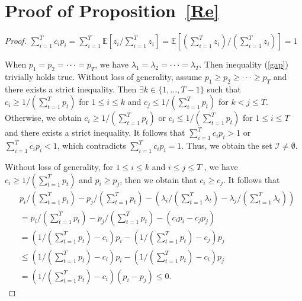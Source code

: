 \documentclass{article} \usepackage{iclr2019_conference,times}
\begin{document}
\section{Proof of Proposition~\ref{Re}}\label{proof_re} 

\begin{proof}


$\sum\nolimits_{i = 1} ^T {c_ip_i}   =   \sum\nolimits_{i = 1}^T {\mathbb{E}[{z_i}/\sum\nolimits_{i=1}^T{{z_i}} ]} = \mathbb{E}\left[ (\sum\nolimits_{i=1}^T{{z_i}})/(\sum\nolimits_{i=1}^T{{z_i}}) \right]   =1$

When $p_1 = p_2 = \cdot \cdot  \cdot = p_T$, we have $\lambda_1 = \lambda_2 = \cdot \cdot  \cdot = \lambda_T$. Then inequality (\ref{gap}) trivially holds true.
Without loss of generality, assume $p_1 \ge p_2 \ge \cdot \cdot  \cdot \ge p_T$ and there exists a strict inequality.  Then $\exists k \in \{1,...,T-1 \}$ such that $c_i \ge 1/({\sum\nolimits_{t = 1}^T {{p_t}} })$ for $ 1 \le i \le k$ and $c_j \le 1/({\sum\nolimits_{t = 1}^T {{p_t}} })$ for   $ k < j \le T$. Otherwise, we obtain  $c_i \ge 1/({\sum\nolimits_{t = 1}^T {{p_t}} })$  or  $c_i \le 1/({\sum\nolimits_{t = 1}^T {{p_t}} })$ for $ 1 \le i \le T$ and there exists a strict inequality. It follows that    $ \sum\nolimits_{i=1}^T{c_ip_i} > 1$ or  $ \sum\nolimits_{i=1}^T{c_ip_i} < 1$, which  contradicts  $ \sum\nolimits_{i=1}^T{c_ip_i} = 1$.  Thus, we obtain the set  $\mathcal{I} \ne \emptyset  $.


Without loss of generality, 
for $ 1 \le i \le k$ and $i \le j \le T$ , we  have $c_i \ge 1/({\sum\nolimits_{t = 1}^T {{p_t}} })$ and $p_i \ge p_j$, then we obtain that $c_i \ge c_j$. It follows that 
\begin{align}
& {p_i}/(\sum\nolimits_{t = 1}^T {{p_t}} ) - {p_j}/(\sum\nolimits_{t = 1}^T {{p_t}} ) - \left( {{\lambda _i}/(\sum\nolimits_{t = 1}^T {{\lambda _t}} ) - {\lambda _j}/(\sum\nolimits_{t = 1}^T {{\lambda _t}} )} \right)\\
& = {p_i}/(\sum\nolimits_{t = 1}^T {{p_t}} ) - {p_j}/(\sum\nolimits_{t = 1}^T {{p_t}} ) - \left( {{c_i}{p_i} - {c_j}{p_j}} \right)\\
& = \left( {1/(\sum\nolimits_{t = 1}^T {{p_t}} ) - {c_i}} \right){p_i} - \left( {1/(\sum\nolimits_{t = 1}^T {{p_t}} ) - {c_j}} \right){p_j}\\
& \le \left( {1/(\sum\nolimits_{t = 1}^T {{p_t}} ) - {c_i}} \right){p_i} - \left( {1/(\sum\nolimits_{t = 1}^T {{p_t}} ) - {c_i}} \right){p_j}\\
& = \left( {1/(\sum\nolimits_{t = 1}^T {{p_t}} ) - {c_i}} \right)\left( {{p_i} - {p_j}} \right) \le 0.
\end{align}
















\end{proof}
\end{document}
